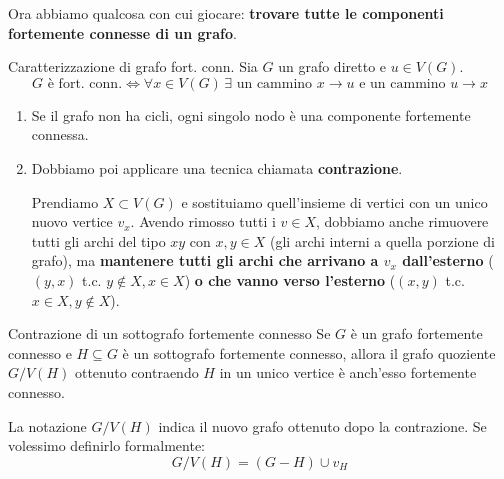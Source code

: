 \documentclass[12pt]{report}
\begin{document}
	Ora abbiamo qualcosa con cui giocare: \textbf{trovare tutte le componenti fortemente connesse di un grafo}.
	
	\begin{proposizione}{Caratterizzazione di grafo fort. conn.}{}
		Sia $G$ un grafo diretto e $u \in V(G)$.
		\[
		G \text{ è fort. conn.} \iff \forall x \in V(G) \, \exists \text{ un cammino } x \to u \text{ e un cammino } u \to x
		\]
	\end{proposizione}
	
	\begin{enumerate}
		\item Se il grafo non ha cicli, ogni singolo nodo è una componente fortemente connessa.
		
		\item Dobbiamo poi applicare una tecnica chiamata \textbf{contrazione}.
		
		Prendiamo $X \subset V(G)$ e sostituiamo quell'insieme di vertici con un unico nuovo vertice $v_x$. Avendo rimosso tutti i $v \in X$, dobbiamo anche rimuovere tutti gli archi del tipo $xy$ con $x, y \in X$ (gli archi interni a quella porzione di grafo), ma \textbf{mantenere tutti gli archi che arrivano a $v_x$ dall'esterno} ($(y, x)$ t.c. $y \notin X, x \in X$) \textbf{o che vanno verso l'esterno} ($(x, y)$ t.c. $x \in X, y \notin X$).
	\end{enumerate}
	
	\begin{proposizione}{Contrazione di un sottografo fortemente connesso}{}
		Se $G$ è un grafo fortemente connesso e $H \subseteq G$ è un sottografo fortemente connesso, allora il grafo quoziente $G / V(H)$ ottenuto contraendo $H$ in un unico vertice è anch'esso fortemente connesso.
	\end{proposizione}
	
	La notazione $G / V(H)$ indica il nuovo grafo ottenuto dopo la contrazione. Se volessimo definirlo formalmente:
	\[
	G / V(H) = (G - H) \cup v_H
	\]
	
\end{document}

